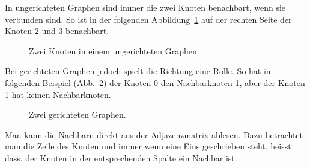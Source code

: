 \begin{mbsp}
In ungerichteten Graphen sind immer die zwei Knoten benachbart, wenn sie verbunden sind. 
So ist in der folgenden Abbildung~\ref{fig:bsp:unbar} auf der rechten Seite der Knoten 2 und 3 benachbart. 
\begin{figure}[htb]
\begin{center}

\caption{Zwei Knoten in einem ungerichteten Graphen.}
\label{fig:bsp:unbar}
\end{center}
\end{figure}
Bei gerichteten Graphen jedoch spielt die Richtung eine Rolle. So hat im folgenden Beispiel (Abb.~\ref{fig:bsp:gnbar}) der Knoten 0 den Nachbarknoten 1, aber der Knoten 1 hat keinen Nachbarknoten. 
\begin{figure}[htb]
\begin{center}
\caption{Zwei gerichteten Graphen.}
\label{fig:bsp:gnbar}
\end{center}
\end{figure}
\end{mbsp}


Man kann die Nachbarn direkt aus der Adjazenzmatrix ablesen. 
Dazu betrachtet man die Zeile des Knoten und immer wenn eine Eins geschrieben steht, heisst dass, der Knoten in der entsprechenden Spalte ein Nachbar ist.

